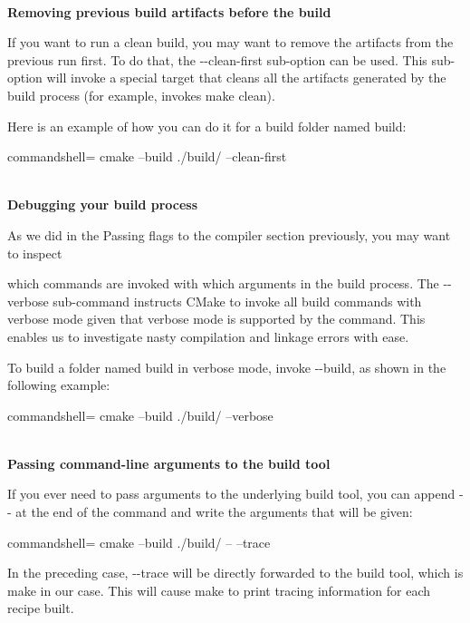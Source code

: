 \hspace*{\fill} \\ %
\noindent
\textbf{Removing previous build artifacts before the build}

If you want to run a clean build, you may want to remove the artifacts from the  previous run first. To do that, the -{}-clean-first sub-option can be used. This sub-option will invoke a special target that cleans all the artifacts generated by the build process (for example, invokes make clean).

Here is an example of how you can do it for a build folder named build:

\begin{tcblisting}{commandshell={}}
cmake --build ./build/ --clean-first
\end{tcblisting}

\hspace*{\fill} \\ %
\noindent
\textbf{Debugging your build process}

As we did in the Passing flags to the compiler section previously, you may want to inspect

which commands are invoked with which arguments in the build process. The -{}-verbose sub-command instructs CMake to invoke all build commands with verbose mode given that verbose mode is supported by the command. This enables us to investigate nasty compilation and linkage errors with ease.

To build a folder named build in verbose mode, invoke -{}-build, as shown in the following example:

\begin{tcblisting}{commandshell={}}
cmake --build ./build/ --verbose
\end{tcblisting}

\hspace*{\fill} \\ %
\noindent
\textbf{Passing command-line arguments to the build tool}

If you ever need to pass arguments to the underlying build tool, you can append -{}- at the end of the command and write the arguments that will be given:

\begin{tcblisting}{commandshell={}}
cmake --build ./build/ -- --trace
\end{tcblisting}

In the preceding case, -{}-trace will be directly forwarded to the build tool, which is make in our case. This will cause make to print tracing information for each recipe built.

